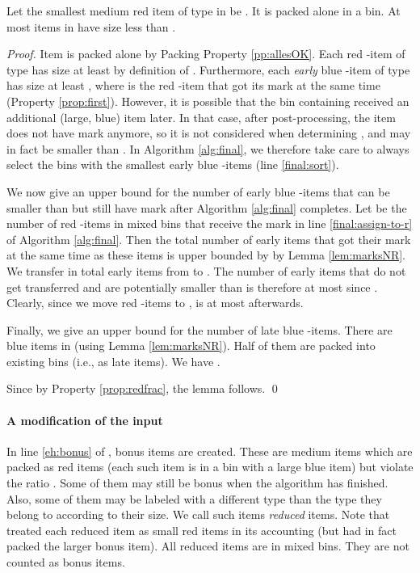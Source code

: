 \begin{lemma}
\label{lem:smallestred1}
Let the smallest medium red item of type  in  be . 
It is packed alone in a bin.
At most 
items in  have size less than .
\end{lemma}
\begin{proof}
Item  is packed alone by Packing Property \ref{pp:allesOK}.
Each red -item of type  has size at least  by definition of .
Furthermore, each \emph{early} blue -item of type  has size at least , where
 is the red -item that got its mark at the same time (Property \ref{prop:first}).
However, it is possible that the bin containing  received an additional (large, blue) item later.
In that case, after post-processing, the item  does not have mark  anymore,
so it is not considered when determining , and may in fact be smaller than .
In Algorithm \ref{alg:final}, we therefore take care to always select the bins with
the smallest early blue -items (line \ref{final:sort}). 

We now give an upper bound for the number of early blue -items that can be smaller than  but still have mark  after Algorithm \ref{alg:final} completes.
Let  be the number of red -items in mixed bins
that receive the mark  in line \ref{final:assign-to-r} of Algorithm \ref{alg:final}.
Then the total number of early items that got their mark  at the same time as these
 items is upper bounded by  by Lemma \ref{lem:marksNR}.
We transfer in total  early items from  to .
The number of early items that do not get transferred and are potentially smaller than 
is therefore at most   since .
Clearly, since we move  red -items to ,
 is at most  afterwards.

Finally, we give an upper bound for the number of late blue -items.
There are  blue items in  (using Lemma \ref{lem:marksNR}).
Half of them are packed into existing bins (i.e., as late items).
We have .

Since  by Property \ref{prop:redfrac}, the lemma follows.
\qed\end{proof}



\paragraph{A modification of the input}
\label{sec:mod}
In line \ref{eh:bonus} of {\EHarm}, bonus items are created. These are medium items which are packed as red items (each such item is in a bin with a large blue item) but violate the ratio . 
Some of them may still be bonus when the algorithm has finished. 
Also, some of them may be
labeled with a different type than the type they belong to according to their size. 
We call such items \emph{reduced} items. Note that {\EHarm} treated each reduced item as small red items in its accounting (but had in fact packed the larger bonus item).
All reduced items are in mixed bins. They are not counted as bonus items.

